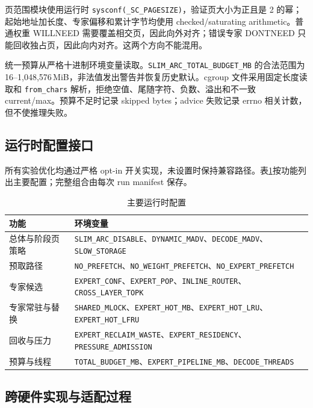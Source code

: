 页范围模块使用运行时 \texttt{sysconf(\_SC\_PAGESIZE)}，验证页大小为正且是 2 的幂；起始地址加长度、专家偏移和累计字节均使用 checked/saturating arithmetic。普通权重 WILLNEED 需要覆盖相交页，因此向外对齐；错误专家 DONTNEED 只能回收独占页，因此向内对齐。这两个方向不能混用。

统一预算从严格十进制环境变量读取。\texttt{SLIM\_ARC\_TOTAL\_BUDGET\_MB} 的合法范围为 16--1,048,576\,MiB，非法值发出警告并恢复历史默认。cgroup 文件采用固定长度读取和 \texttt{from\_chars} 解析，拒绝空值、尾随字符、负数、溢出和不一致 current/max。预算不足时记录 skipped bytes；advice 失败记录 errno 相关计数，但不使推理失败。

\subsection{运行时配置接口}

所有实验优化均通过严格 opt-in 开关实现，未设置时保持兼容路径。表\ref{tab:runtime-flags}按功能列出主要配置；完整组合由每次 run manifest 保存。

\begin{table}[H]
  \centering
  \scriptsize
  \caption{主要运行时配置}
  \label{tab:runtime-flags}
  \begin{tabular}{p{}p{}}
    \toprule
    功能 & 环境变量 \\
    \midrule
    总体与阶段页策略 & \texttt{SLIM\_ARC\_DISABLE}、\texttt{DYNAMIC\_MADV}、\texttt{DECODE\_MADV}、\texttt{SLOW\_STORAGE} \\
    预取路径 & \texttt{NO\_PREFETCH}、\texttt{NO\_WEIGHT\_PREFETCH}、\texttt{NO\_EXPERT\_PREFETCH} \\
    专家候选 & \texttt{EXPERT\_CONF}、\texttt{EXPERT\_POP}、\texttt{INLINE\_ROUTER}、\texttt{CROSS\_LAYER\_TOPK} \\
    专家常驻与替换 & \texttt{SHARED\_MLOCK}、\texttt{EXPERT\_HOT\_MB}、\texttt{EXPERT\_HOT\_LRU}、\texttt{EXPERT\_HOT\_LFRU} \\
    回收与压力 & \texttt{EXPERT\_RECLAIM\_WASTE}、\texttt{EXPERT\_RESIDENCY}、\texttt{PRESSURE\_ADMISSION} \\
    预算与线程 & \texttt{TOTAL\_BUDGET\_MB}、\texttt{EXPERT\_PIPELINE\_MB}、\texttt{DECODE\_THREADS} \\
    \bottomrule
  \end{tabular}
\end{table}

\subsection{跨硬件实现与适配过程}

